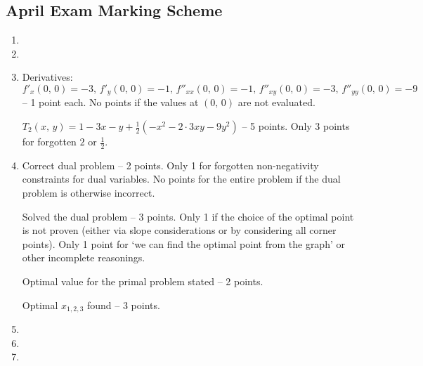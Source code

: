 \subsection{April Exam Marking Scheme}
\begin{enumerate}
  \item %
  \item %
  \item %
      Derivatives: $f'_x(0,\,0)=-3,\,f'_y(0,\,0)=-1,\,f''_{xx}(0,\,0)=-1,\,f''_{xy}(0,\,0)=-3,\,f''_{yy}(0,\,0)=-9$ -- 1 point each. No points if the values at $(0,\,0)$ are not evaluated.
      
      $T_2(x,\,y)=1-3x-y+\frac12(-x^2-2\cdot3xy-9y^2)$ -- 5 points. Only 3 points for forgotten $2$ or $\frac12$.
  \item %
      Correct dual problem -- 2 points. Only 1 for forgotten non-negativity constraints for dual variables. No points for the entire problem if the dual problem is otherwise incorrect.
      
      Solved the dual problem -- 3 points. Only 1 if the choice of the optimal point is not proven (either via slope considerations or by considering all corner points). Only 1 point for `we can find the optimal point from the graph' or other incomplete reasonings.
      
      Optimal value for the primal problem stated -- 2 points.
      
      Optimal $x_{1,2,3}$ found -- 3 points.
  \item %
  \item %
  \item %
  

\end{enumerate}
